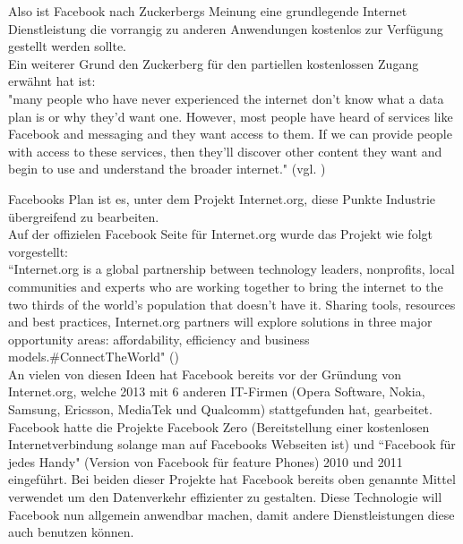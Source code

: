 \documentclass{article}
\begin{document}
Also ist Facebook nach Zuckerbergs Meinung eine grundlegende Internet Dienstleistung die vorrangig zu anderen Anwendungen kostenlos zur Verfügung gestellt werden sollte.\\
Ein weiterer Grund den Zuckerberg für den partiellen kostenlossen Zugang erwähnt hat ist:\\
"many people who have never experienced the internet don’t know what a data plan is or why they’d want one. 
However, most people have heard of services like Facebook and messaging and they want access to them. If we can provide people 
with access to these services, then they’ll discover other content they want and begin to use 
and understand the broader internet." (vgl. \cite{HumanRight})

\medskip

Facebooks Plan ist es, unter dem Projekt Internet.org, diese Punkte Industrie übergreifend zu bearbeiten. \\
Auf der offizielen Facebook Seite für Internet.org wurde das Projekt wie folgt vorgestellt:\\

``Internet.org is a global partnership between technology leaders, nonprofits, local communities and experts who are working together to bring the internet to the two thirds of the world's population that doesn't have it. Sharing tools, resources and best practices, Internet.org partners will explore solutions in three major opportunity areas: affordability, efficiency and business models.\#ConnectTheWorld" (\cite{InternetOrg})\\

An vielen von diesen Ideen hat Facebook bereits vor der Gründung von Internet.org, welche 2013 mit 6 anderen IT-Firmen (Opera Software, Nokia, Samsung, Ericsson, MediaTek und Qualcomm) stattgefunden hat, gearbeitet.
Facebook hatte die Projekte Facebook Zero (Bereitstellung einer kostenlosen Internetverbindung solange man auf Facebooks Webseiten ist) und ``Facebook für jedes Handy" (Version von Facebook für feature Phones) 2010 und 2011 eingeführt.
Bei beiden dieser Projekte hat Facebook bereits oben genannte Mittel verwendet um den Datenverkehr effizienter zu gestalten.
Diese Technologie will Facebook nun allgemein anwendbar machen, damit andere Dienstleistungen diese auch benutzen können.

\end{document}
